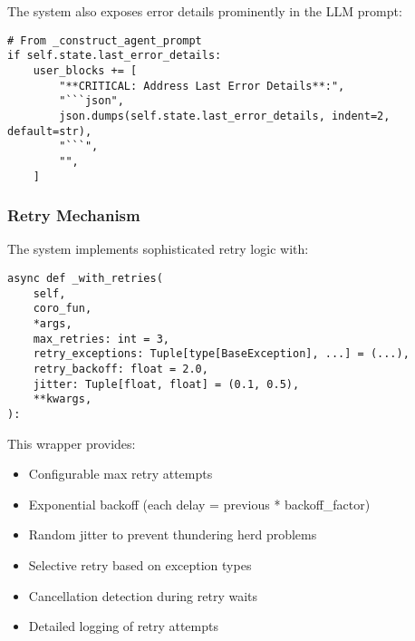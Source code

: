 \documentclass[12pt,a4paper]{article}
\begin{document}
The system also exposes error details prominently in the LLM prompt:
\begin{pageablecode}
\begin{verbatim}
# From _construct_agent_prompt
if self.state.last_error_details:
    user_blocks += [
        "**CRITICAL: Address Last Error Details**:",
        "```json",
        json.dumps(self.state.last_error_details, indent=2, default=str),
        "```",
        "",
    ]
\end{verbatim}
\end{pageablecode}

\subsubsection*{Retry Mechanism}

The system implements sophisticated retry logic with:
\begin{pageablecode}
\begin{verbatim}
async def _with_retries(
    self,
    coro_fun,
    *args,
    max_retries: int = 3,
    retry_exceptions: Tuple[type[BaseException], ...] = (...),
    retry_backoff: float = 2.0,
    jitter: Tuple[float, float] = (0.1, 0.5),
    **kwargs,
):
\end{verbatim}
\end{pageablecode}
This wrapper provides:
\begin{itemize}
    \item Configurable max retry attempts
    \item Exponential backoff (each delay = previous * backoff\_factor)
    \item Random jitter to prevent thundering herd problems
    \item Selective retry based on exception types
    \item Cancellation detection during retry waits
    \item Detailed logging of retry attempts
\end{itemize}
\end{document}

